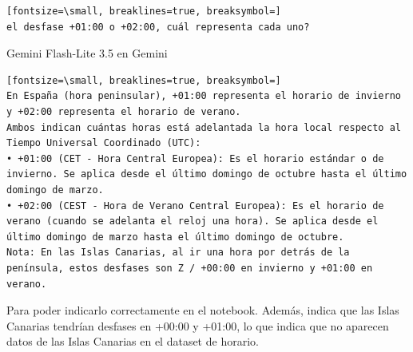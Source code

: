 \documentclass[12pt,a4paper,oneside]{book}
\begin{document}
\begin{iaprompt}
\begin{Verbatim}[fontsize=\small, breaklines=true, breaksymbol=]
el desfase +01:00 o +02:00, cuál representa cada uno?
\end{Verbatim}
\end{iaprompt}
\begin{iaresp}{Gemini Flash-Lite 3.5 en Gemini}
\begin{Verbatim}[fontsize=\small, breaklines=true, breaksymbol=]
En España (hora peninsular), +01:00 representa el horario de invierno y +02:00 representa el horario de verano.
Ambos indican cuántas horas está adelantada la hora local respecto al Tiempo Universal Coordinado (UTC):
• +01:00 (CET - Hora Central Europea): Es el horario estándar o de invierno. Se aplica desde el último domingo de octubre hasta el último domingo de marzo.
• +02:00 (CEST - Hora de Verano Central Europea): Es el horario de verano (cuando se adelanta el reloj una hora). Se aplica desde el último domingo de marzo hasta el último domingo de octubre.
Nota: En las Islas Canarias, al ir una hora por detrás de la península, estos desfases son Z / +00:00 en invierno y +01:00 en verano.
\end{Verbatim}
\end{iaresp}
\begin{iaanalisis}
Para poder indicarlo correctamente en el notebook. Además, indica que las Islas Canarias tendrían desfases en +00:00 y +01:00, lo que indica que no aparecen datos de las Islas Canarias en el dataset de horario.
\end{iaanalisis}
\end{document}
